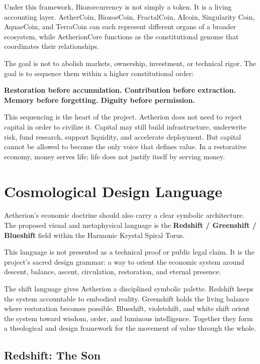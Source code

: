 \documentclass[12pt]{article}
\begin{document}
Under this framework, Biozoecurrency is not simply a token. It is a living accounting layer. AetherCoin, BiozoeCoin, FractalCoin, AIcoin, Singularity Coin, AquaeCoin, and TerraCoin can each represent different organs of a broader ecosystem, while AetherionCore functions as the constitutional genome that coordinates their relationships.

The goal is not to abolish markets, ownership, investment, or technical rigor. The goal is to sequence them within a higher constitutional order:

\begin{center}
\textbf{Restoration before accumulation. Contribution before extraction. Memory before forgetting. Dignity before permission.}
\end{center}

This sequencing is the heart of the project. Aetherion does not need to reject capital in order to civilize it. Capital may still build infrastructure, underwrite risk, fund research, support liquidity, and accelerate deployment. But capital cannot be allowed to become the only voice that defines value. In a restorative economy, money serves life; life does not justify itself by serving money.

\section{Cosmological Design Language}

Aetherion's economic doctrine should also carry a clear symbolic architecture. The proposed visual and metaphysical language is the \textbf{Redshift / Greenshift / Blueshift} field within the Harmonic Krystal Spiral Torus.

This language is not presented as a technical proof or public legal claim. It is the project's sacred design grammar: a way to orient the economic system around descent, balance, ascent, circulation, restoration, and eternal presence.

The shift language gives Aetherion a disciplined symbolic palette. Redshift keeps the system accountable to embodied reality. Greenshift holds the living balance where restoration becomes possible. Blueshift, violetshift, and white shift orient the system toward wisdom, order, and luminous intelligence. Together they form a theological and design framework for the movement of value through the whole.

\aftShiftMap

\subsection{Redshift: The Son}
\end{document}
